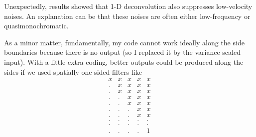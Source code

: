 
\par
Unexpectedly, results showed that 1-D deconvolution
also suppresses low-velocity noises.
An explanation can be that these noises are often either low-frequency
or quasimonochromatic.

\par
As a minor matter, fundamentally,
my code cannot work ideally along the side boundaries
because there is no output
(so I replaced it by the variance scaled input).
With a little extra coding,
better outputs could be produced along the sides
if we used spatially one-sided filters like
\begin{equation}
   \begin{array}{ccccc}
                 x&  x&  x&  x&  x \\
                 .&  x&  x&  x&  x \\
                 .&  x&  x&  x&  x \\
                 .&  .&  x&  x&  x \\
                 .&  .&  x&  x&  x \\
                 .&  .&  .&  x&  x \\
                 .&  .&  .&  x&  x \\
                 .&  .&  .&  .&  . \\
                 .&  .&  .&  .&  . \\
                 .&  .&  .&  .&  1
      \end{array}
\end{equation}

